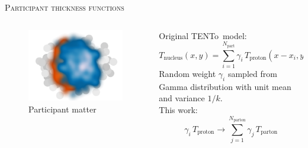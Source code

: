 \documentclass[aspectratio=169]{beamer}
\newcommand{\trento}{T\raisebox{-0.3ex}{R}ENTo}
\begin{document}
\begin{frame}[t]{\scshape Participant thickness functions}
  \begin{columns}[T]
    \begin{column}{.5\textwidth}
      \begin{figure}
        \includegraphics[width=\textwidth]{trento_thickness}\\
        \small Participant matter
      \end{figure}
    \end{column}
    \begin{column}{.5\textwidth}
      \centering \bigskip
      \textcolor{theme}{Original \trento\ model:}
      \begin{equation*}
        T_\text{nucleus}(x, y) = \sum\limits_{i=1}^{N_\text{part}}
        \gamma_i\, T_\text{proton}(x - x_i, y - y_i)
      \end{equation*}
      {\small Random weight $\gamma_i$ sampled from Gamma distribution with unit mean
      and variance $1/k$.}\\[2ex]
      \textcolor{theme}{This work:}
      \begin{equation*}
        \gamma_i\, T_\text{proton} \rightarrow \sum\limits_{j=1}^{N_\text{parton}}
        \gamma_j\,T_\text{parton}
      \end{equation*}
    \end{column}
  \end{columns}
\end{frame}
\end{document}
